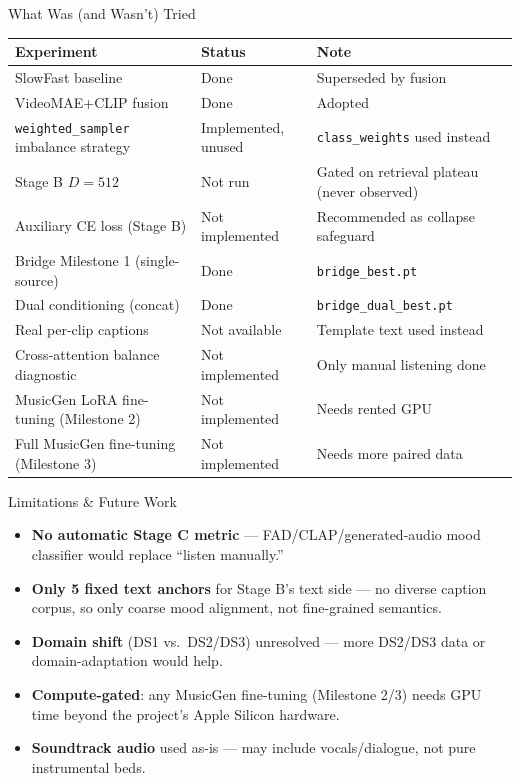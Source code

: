 \documentclass[aspectratio=169,11pt]{beamer}
\begin{document}
\begin{frame}{What Was (and Wasn't) Tried}
\small
\begin{tabular}{@{}p{5.2cm}p{2.6cm}p{4cm}@{}}
\toprule
Experiment & Status & Note \\
\midrule
SlowFast baseline & Done & Superseded by fusion \\
VideoMAE+CLIP fusion & Done & Adopted \\
\texttt{weighted\_sampler} imbalance strategy & Implemented, unused & \texttt{class\_weights} used instead \\
Stage B $D=512$ & Not run & Gated on retrieval plateau (never observed) \\
Auxiliary CE loss (Stage B) & Not implemented & Recommended as collapse safeguard \\
Bridge Milestone 1 (single-source) & Done & \texttt{bridge\_best.pt} \\
Dual conditioning (concat) & Done & \texttt{bridge\_dual\_best.pt} \\
Real per-clip captions & Not available & Template text used instead \\
Cross-attention balance diagnostic & Not implemented & Only manual listening done \\
MusicGen LoRA fine-tuning (Milestone 2) & Not implemented & Needs rented GPU \\
Full MusicGen fine-tuning (Milestone 3) & Not implemented & Needs more paired data \\
\bottomrule
\end{tabular}
\end{frame}

\begin{frame}{Limitations \& Future Work}
\begin{itemize}
  \item \textbf{No automatic Stage C metric} --- FAD/CLAP/generated-audio mood classifier would
  replace ``listen manually.''
  \item \textbf{Only 5 fixed text anchors} for Stage B's text side --- no diverse caption corpus,
  so only coarse mood alignment, not fine-grained semantics.
  \item \textbf{Domain shift} (DS1 vs.\ DS2/DS3) unresolved --- more DS2/DS3 data or
  domain-adaptation would help.
  \item \textbf{Compute-gated}: any MusicGen fine-tuning (Milestone 2/3) needs GPU time beyond
  the project's Apple Silicon hardware.
  \item \textbf{Soundtrack audio} used as-is --- may include vocals/dialogue, not pure
  instrumental beds.
\end{itemize}
\end{frame}
\end{document}
